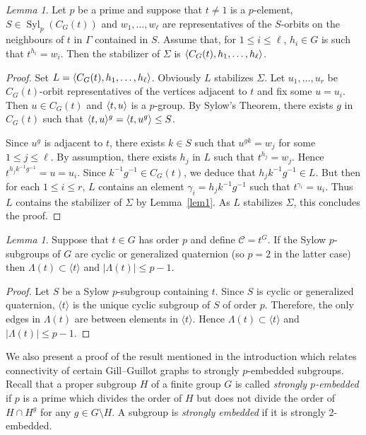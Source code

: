 \documentclass[11pt,a4paper]{amsart}
\theoremstyle{plain}
\theoremstyle{definition}
\theoremstyle{remark}
\newtheorem{lemma}[definition]{Lemma}
\theoremstyle{remark}
\theoremstyle{remark}
\theoremstyle{definition}
\DeclareMathOperator{\Syl}{Syl}
\DeclarePairedDelimiter{\gen}{\langle}{\rangle}
\begin{document}
\begin{lemma}\label{lem1variant} Let $p$ be a prime and suppose that $t\ne 1 $ is a $p$-element, $S \in \Syl_p(C_G(t))$ and $ w_1, \dots, w_\ell $ are representatives of the $S$-orbits on the neighbours of $t$ in $\Gamma$ contained in $S$. Assume that, for $1 \le i \le \ell$, $h_i \in G$ is such that $t^{h_i}=w_i$. Then the stabilizer of $\Sigma$ is $\gen{C_G(t), h_1, \dots,h_\ell}$.
\end{lemma}
\begin{proof} Set $L=\gen{C_G(t), h_1, \dots,h_\ell}$. Obviously $L$ stabilizes $\Sigma$. Let $u_1,\dots,u_r$ be $C_G(t)$-orbit representatives of the vertices adjacent to $t$ and fix some $u=u_i$. Then $u \in C_G(t)$ and $\gen{t,u} $ is a $p$-group. By Sylow's Theorem, there exists $g$ in $C_G(t)$ such that $\gen{t,u}^g= \gen{t,u^g} \le S$.

Since $u^g$ is adjacent to $t$, there exists $k \in S$ such that $u^{gk}=w_j$ for some $1\le j \le \ell$. By assumption, there exists $h_j$ in $L$ such that $t^{h_j}= w_{j}$. Hence $t^{h_jk^{-1}g^{-1}}=u=u_i$. Since $k^{-1}g^{-1} \in C_G(t)$, we deduce that $h_jk^{-1}g^{-1} \in L$. But then for each $1\le i\le r$, $L$ contains an element $\gamma_i=h_jk^{-1}g^{-1}$ such that $t^{\gamma_i}= u_i$. Thus $L$ contains the stabilizer of $\Sigma$ by Lemma~\ref{lem1}. As $L$ stabilizes $\Sigma$, this concludes the proof.
\end{proof}

\begin{lemma}\label{lem:notcyclic} Suppose that $t\in G$ has order $p$ and define $\mathcal C=t^G$. If the Sylow $p$-subgroups of $G$ are cyclic or generalized quaternion (so $p=2$ in the latter case) then $\Lambda(t)\subset \langle t\rangle$ and $|\Lambda(t)|\le p-1$.
\end{lemma}
\begin{proof} Let $S$ be a Sylow $p$-subgroup containing $t$. Since $S$ is cyclic or generalized quaternion, $\langle t\rangle$ is the unique cyclic subgroup of $S$ of order $p$. Therefore, the only edges in $\Lambda(t)$ are between elements in $\langle t\rangle$. Hence $\Lambda(t) \subset \langle t\rangle$ and $|\Lambda(t)|\le p-1$.
\end{proof}

We also present a proof of the result mentioned in the introduction which relates connectivity of certain Gill--Guillot graphs to strongly $p$-embedded subgroups. Recall that a proper subgroup $H$ of a finite group $G$ is called \emph{strongly $p$-embedded} if $p$ is a prime which divides the order of $H$ but does not divide the order of $H\cap H^g$ for any $g\in G\setminus H$. A subgroup is \emph{strongly embedded} if it is strongly 2-embedded.
\end{document}
